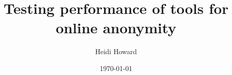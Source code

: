 \documentclass[12pt,a4paper,oneside]{article}
\begin{document}
\title{Testing performance of tools for online anonymity }
\author{Heidi Howard}
\date{\today}
\maketitle
\end{document}
